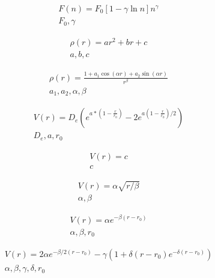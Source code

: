 \documentclass[a4paper,10pt]{article}
\begin{document}
\begin{eqnarray*}
F(n)=F_0\left[1-\gamma\ln n\right]n^\gamma \\
F_0,\gamma
\end{eqnarray*}

\begin{eqnarray*}
\rho(r)=ar^2+br+c \\
a,b,c
\end{eqnarray*}

\begin{eqnarray*}
\rho(r)=\frac{1+a_1\cos\left(\alpha r\right)+a_2\sin\left(\alpha r\right)}{r^\beta} \\
a_1,a_2,\alpha,\beta
\end{eqnarray*}

\begin{eqnarray*}
V(r)=D_e (e^{a*(1-\frac{r}{r_0})}-2e^{a(1-\frac{r}{r_0})/2}) \\
D_e,a,r_0
\end{eqnarray*}

\begin{eqnarray*}
V(r)= c \\
c
\end{eqnarray*}

\begin{eqnarray*}
V(r)= \alpha \sqrt{r/\beta} \\
\alpha,\beta
\end{eqnarray*}

\begin{eqnarray*}
V(r)=\alpha e^{-\beta(r-r_0)} \\
\alpha,\beta,r_0
\end{eqnarray*}

\begin{eqnarray*}
V(r)= 2\alpha e^{-\beta/2(r-r_0)} - \gamma ( 1+ \delta (r-r_0)e^{-\delta (r-r_0)}) \\
\alpha,\beta,\gamma,\delta,r_0
\end{eqnarray*}
\end{document}
